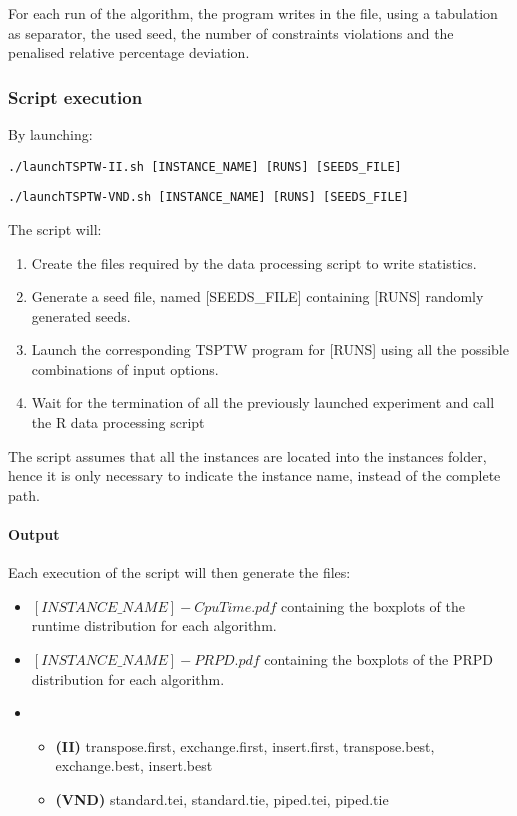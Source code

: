\documentclass{article}
\begin{document}
For each run of the algorithm, the program writes in the file, using a tabulation as separator,
the used seed, the number of constraints violations and the penalised relative percentage deviation.


\subsubsection{Script execution}
By launching:
\begin{center}
\begin{verbatim}
./launchTSPTW-II.sh [INSTANCE_NAME] [RUNS] [SEEDS_FILE]
\end{verbatim}
\begin{verbatim}
./launchTSPTW-VND.sh [INSTANCE_NAME] [RUNS] [SEEDS_FILE]
\end{verbatim}
\end{center}

The script will:
\begin{enumerate}
  \item Create the files required by the data processing script to write statistics.
  \item Generate a seed file, named [SEEDS\_FILE] containing [RUNS] randomly generated seeds.
  \item Launch the corresponding TSPTW program for [RUNS]  using all the possible combinations of input options.
  \item Wait for the termination of all the previously launched experiment and call the R data processing script
\end{enumerate}

The script assumes that all the instances are located into the instances folder, hence it is only necessary to indicate the instance name, instead of the complete path.

\paragraph{Output}

Each execution of the script will then generate the files:
\begin{itemize}
  \item $[INSTANCE\_NAME]-CpuTime.pdf$ containing the boxplots of the runtime distribution for each algorithm.
  \item $[INSTANCE\_NAME]-PRPD.pdf$ containing the boxplots of the PRPD distribution for each algorithm.
  \item 
        \begin{itemize}
          \item \textbf{(II)} transpose.first, exchange.first, insert.first, transpose.best, exchange.best, insert.best 
          \item \textbf{(VND)} standard.tei, standard.tie, piped.tei, piped.tie
        \end{itemize}
\end{itemize}
\end{document}
